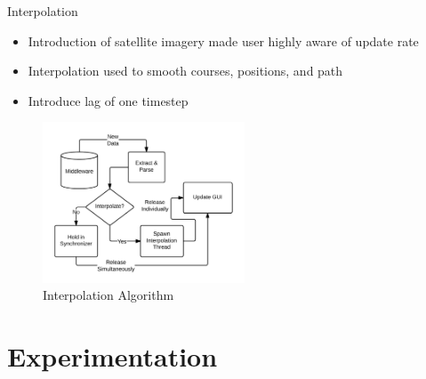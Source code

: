 \documentclass{beamer}
\begin{document}
    \begin{frame}{Interpolation}
          \begin{itemize} \footnotesize
            \item Introduction of satellite imagery made user highly aware of update rate
            \item Interpolation used to smooth courses, positions, and path
            \item Introduce lag of one timestep
          \end{itemize}
          \vspace{-20pt}
          \begin{figure}[ht] \centering
            \includegraphics[width=6cm] {../graphics/middleware_diagram.png}
            \caption{\footnotesize Interpolation Algorithm}
          \end{figure}

    \end{frame}



\section{Experimentation}
\end{document}

